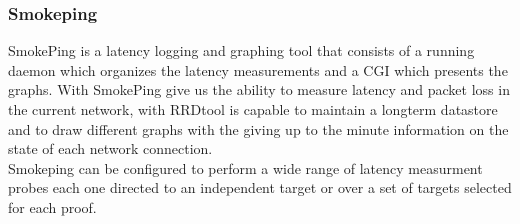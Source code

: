 \subsubsection{Smokeping}
SmokePing is a latency logging and graphing tool that consists of a running 
daemon which organizes the latency measurements and a CGI which presents the 
graphs. With SmokePing give us the ability to measure latency and packet loss 
in the current network, with RRDtool is capable to maintain a longterm 
datastore and to draw different graphs with the giving up to the minute 
information on the state of each network connection.\\

Smokeping can be configured to perform a wide range of latency measurment 
probes each one directed to an independent target or over a set of targets 
selected for each proof.\\


